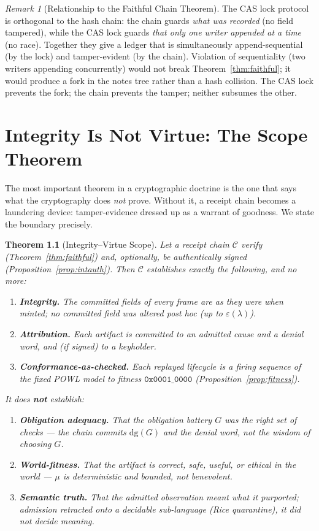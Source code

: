 \documentclass[11pt,oneside]{book}
\theoremstyle{definition}
\theoremstyle{plain}
\newtheorem{theorem}{Theorem}[chapter]
\theoremstyle{remark}
\newtheorem*{remark}{Remark}
\newcommand{\muop}{\mu}                        %
\newcommand{\dg}{\mathrm{dg}}                   %
\newcommand{\code}[1]{\texttt{#1}}
\newcommand{\Ledger}{\mathcal{C}}               %
\begin{document}
\begin{remark}[Relationship to the Faithful Chain Theorem]
The CAS lock protocol is orthogonal to the hash chain: the chain guards \emph{what was
recorded} (no field tampered), while the CAS lock guards \emph{that only one writer
appended at a time} (no race). Together they give a ledger that is simultaneously
append-sequential (by the lock) and tamper-evident (by the chain). Violation of
sequentiality (two writers appending concurrently) would not break Theorem~\ref{thm:faithful};
it would produce a fork in the notes tree rather than a hash collision. The CAS lock
prevents the fork; the chain prevents the tamper; neither subsumes the other.
\end{remark}

\chapter{Integrity Is Not Virtue: The Scope Theorem}
\label{ch:scope}

The most important theorem in a cryptographic doctrine is the one that says what the
cryptography does \emph{not} prove. Without it, a receipt chain becomes a laundering device:
tamper-evidence dressed up as a warrant of goodness. We state the boundary precisely.

\begin{theorem}[Integrity--Virtue Scope]\label{thm:scope}
Let a receipt chain $\Ledger$ verify (Theorem~\ref{thm:faithful}) and, optionally, be
authentically signed (Proposition~\ref{prop:intauth}). Then $\Ledger$ establishes exactly the
following, and no more:
\begin{enumerate}[label=(\Alph*),leftmargin=*]
\item \textbf{Integrity.} The committed fields of every frame are as they were when minted;
no committed field was altered post hoc (up to $\varepsilon(\lambda)$).
\item \textbf{Attribution.} Each artifact is committed to an admitted cause and a denial word,
and (if signed) to a keyholder.
\item \textbf{Conformance-as-checked.} Each replayed lifecycle is a firing sequence of the
\emph{fixed} POWL model to fitness $\code{0x0001\_0000}$ (Proposition~\ref{prop:fitness}).
\end{enumerate}
It does \textbf{not} establish:
\begin{enumerate}[label=(\alph*),leftmargin=*]
\item \textbf{Obligation adequacy.} That the obligation battery $G$ was the \emph{right} set of
checks --- the chain commits $\dg(G)$ and the denial word, not the wisdom of choosing $G$.
\item \textbf{World-fitness.} That the artifact is correct, safe, useful, or ethical in the
world --- $\muop$ is deterministic and bounded, not benevolent.
\item \textbf{Semantic truth.} That the admitted observation \emph{meant} what it purported;
admission retracted onto a decidable sub-language (Rice quarantine), it did not decide meaning.
\end{enumerate}
\end{theorem}
\end{document}

